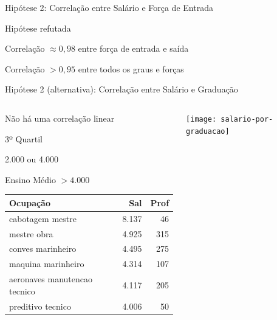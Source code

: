 \documentclass[10pt, hyperref={pdfpagelabels=false, unicode=true}, aspectratio=169]{beamer}
\begin{document}
\begin{frame}[c, label=hipotese-salario]{Hipótese 2: Correlação entre Salário e Força de Entrada}
  \begin{center}
    \Large
    Hipótese \alert{refutada}
    
    \large
    Correlação $\approx 0,98$ entre força de entrada e saída
    
    Correlação $> 0,95$ entre todos os graus e forças
  \end{center}
\end{frame}

{
\begin{frame}[c, label=hipotese-salario-graduacao]{Hipótese 2 (alternativa): Correlação entre Salário e Graduação}
  \begin{center}
    \begin{columns}[onlytextwidth]
      \begin{column}{0.5\textwidth}
        \centering
        Não há uma correlação linear
        
        \vspace{\baselineskip}
        
        3º Quartil
        
        2.000 ou 4.000
        
        \vspace{\baselineskip}
        
        Ensino Médio $> 4.000$
        
        \vspace{0.5\baselineskip}
        
        \tiny
        \begin{table}[!h]
          \begin{tabular}{l|r|r}
            \hline
            Ocupação & Sal & Prof\\
            \hline
            \alert{cabotagem mestre} & 8.137 & 46\\
            \hline
            mestre obra & 4.925 & 315\\
            \hline
            conves marinheiro & 4.495 & 275\\
            \hline
            maquina marinheiro & 4.314 & 107\\
            \hline
            aeronaves manutencao tecnico & 4.117 & 205\\
            \hline
            preditivo tecnico & 4.006 & 50\\
            \hline
          \end{tabular}
        \end{table}
      \end{column}
      
      \begin{column}{0.5\textwidth}
        \texttt{[image: salario-por-graduacao]}
      \end{column}
    \end{columns}
  \end{center}
\end{frame}
}
\end{document}
